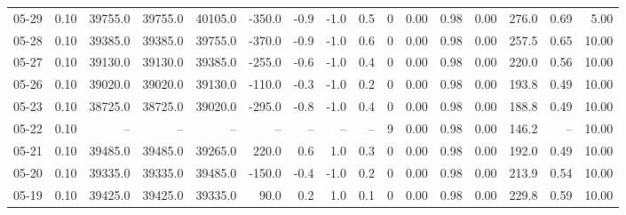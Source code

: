 \begin{threeparttable}
{\begin{tabular}{lrrrrrrrrrrrrrrr}
  05-29 &     0.10 & 39755.0 & 39755.0 & 40105.0 &     -350.0 &           -0.9 &                     -1.0 &                 0.5 &              0 &       0.00 &      0.98 &           0.00 &            276.0 &            0.69 &                   5.00 \\
  05-28 &     0.10 & 39385.0 & 39385.0 & 39755.0 &     -370.0 &           -0.9 &                     -1.0 &                 0.6 &              0 &       0.00 &      0.98 &           0.00 &            257.5 &            0.65 &                  10.00 \\
  05-27 &     0.10 & 39130.0 & 39130.0 & 39385.0 &     -255.0 &           -0.6 &                     -1.0 &                 0.4 &              0 &       0.00 &      0.98 &           0.00 &            220.0 &            0.56 &                  10.00 \\
  05-26 &     0.10 & 39020.0 & 39020.0 & 39130.0 &     -110.0 &           -0.3 &                     -1.0 &                 0.2 &              0 &       0.00 &      0.98 &           0.00 &            193.8 &            0.49 &                  10.00 \\
  05-23 &     0.10 & 38725.0 & 38725.0 & 39020.0 &     -295.0 &           -0.8 &                     -1.0 &                 0.4 &              0 &       0.00 &      0.98 &           0.00 &            188.8 &            0.49 &                  10.00 \\
  05-22 &     0.10 &      -- &      -- &      -- &         -- &             -- &                       -- &                  -- &              9 &       0.00 &      0.98 &           0.00 &            146.2 &              -- &                  10.00 \\
  05-21 &     0.10 & 39485.0 & 39485.0 & 39265.0 &      220.0 &            0.6 &                      1.0 &                 0.3 &              0 &       0.00 &      0.98 &           0.00 &            192.0 &            0.49 &                  10.00 \\
  05-20 &     0.10 & 39335.0 & 39335.0 & 39485.0 &     -150.0 &           -0.4 &                     -1.0 &                 0.2 &              0 &       0.00 &      0.98 &           0.00 &            213.9 &            0.54 &                  10.00 \\
  05-19 &     0.10 & 39425.0 & 39425.0 & 39335.0 &       90.0 &            0.2 &                      1.0 &                 0.1 &              0 &       0.00 &      0.98 &           0.00 &            229.8 &            0.59 &                  10.00 \\

\end{tabular}}
\end{threeparttable}
